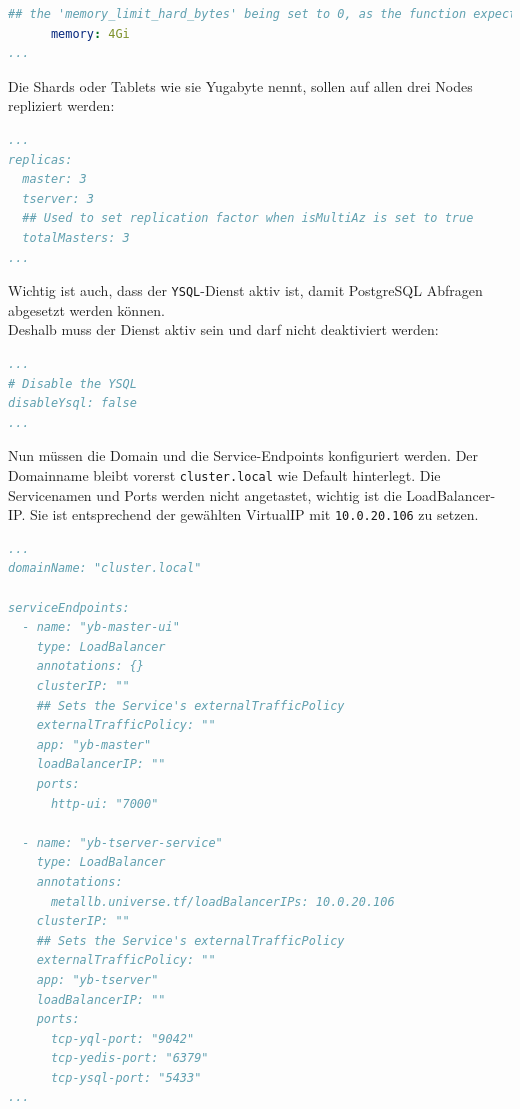 \begin{flushleft}
\begin{lstlisting}[language=yaml, caption=yugabyteDB - Helm Chart Manifest - Detail Resources,captionpos=b,label={lst:yugabytedb-resources-setting},breaklines=true]
      ## the 'memory_limit_hard_bytes' being set to 0, as the function expects integer values.
      memory: 4Gi
...
    \end{lstlisting}
    Die Shards oder Tablets wie sie Yugabyte nennt, sollen auf allen drei Nodes repliziert werden:
    \lstset{style=gra_codestyle}
    \begin{lstlisting}[language=yaml, caption=yugabyteDB - Helm Chart Manifest - Detail Replika,captionpos=b,label={lst:yugabytedb-replica-setting},breaklines=true]
...
replicas:
  master: 3
  tserver: 3
  ## Used to set replication factor when isMultiAz is set to true
  totalMasters: 3
...
    \end{lstlisting}

    Wichtig ist auch, dass der \texttt{YSQL}-Dienst aktiv ist, damit PostgreSQL Abfragen abgesetzt werden können.\\
    Deshalb muss der Dienst aktiv sein und darf nicht deaktiviert werden:
    \lstset{style=gra_codestyle}
    \begin{lstlisting}[language=yaml, caption=yugabyteDB - Helm Chart Manifest - Detail Disable YSQL,captionpos=b,label={lst:yugabytedb-disableYsql-setting},breaklines=true]
...
# Disable the YSQL
disableYsql: false
...
    \end{lstlisting}

    Nun müssen die Domain und die Service-Endpoints konfiguriert werden.
    Der Domainname bleibt vorerst \texttt{cluster.local} wie Default hinterlegt.
    Die Servicenamen und Ports werden nicht angetastet, wichtig ist die LoadBalancer-IP.
    Sie ist entsprechend der gewählten VirtualIP mit \texttt{10.0.20.106} zu setzen.
    \lstset{style=gra_codestyle}
    \begin{lstlisting}[language=yaml, caption=yugabyteDB - Helm Chart Manifest - Detail Domainname und Service-Endpoints,captionpos=b,label={lst:yugabytedb-domainname-serviceendpoints-setting},breaklines=true]
...
domainName: "cluster.local"

serviceEndpoints:
  - name: "yb-master-ui"
    type: LoadBalancer
    annotations: {}
    clusterIP: ""
    ## Sets the Service's externalTrafficPolicy
    externalTrafficPolicy: ""
    app: "yb-master"
    loadBalancerIP: ""
    ports:
      http-ui: "7000"

  - name: "yb-tserver-service"
    type: LoadBalancer
    annotations:
      metallb.universe.tf/loadBalancerIPs: 10.0.20.106
    clusterIP: ""
    ## Sets the Service's externalTrafficPolicy
    externalTrafficPolicy: ""
    app: "yb-tserver"
    loadBalancerIP: ""
    ports:
      tcp-yql-port: "9042"
      tcp-yedis-port: "6379"
      tcp-ysql-port: "5433"
...
    \end{lstlisting}
\end{flushleft}
